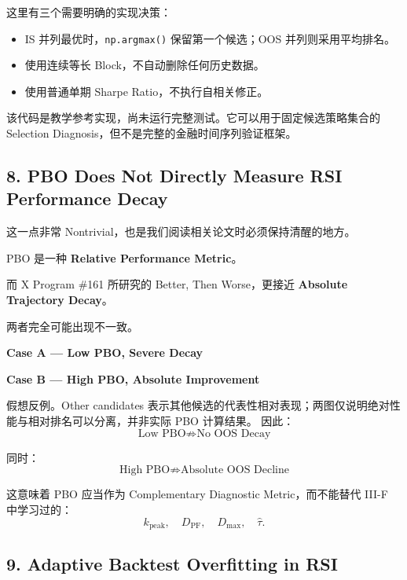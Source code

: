 这里有三个需要明确的实现决策：

\begin{itemize}
\tightlist
\item
  IS 并列最优时，\texttt{np.argmax()} 保留第一个候选；OOS 并列则采用平均排名。
\item
  使用连续等长 Block，不自动删除任何历史数据。
\item
  使用普通单期 Sharpe Ratio，不执行自相关修正。
\end{itemize}

该代码是教学参考实现，尚未运行完整测试。它可以用于固定候选策略集合的 Selection Diagnosis，但不是完整的金融时间序列验证框架。

\hypertarget{part-4-71-0001-pbo-does-not-directly-measure-rsi-performance-decay}{%
\subsection{8. PBO Does Not Directly Measure RSI Performance Decay}\label{part-4-71-0001-pbo-does-not-directly-measure-rsi-performance-decay}}

这一点非常 Nontrivial，也是我们阅读相关论文时必须保持清醒的地方。

PBO 是一种 \textbf{Relative Performance Metric}。

而 X Program \#161 所研究的 Better, Then Worse，更接近 \textbf{Absolute Trajectory Decay}。

两者完全可能出现不一致。

\textbf{Case A --- Low PBO, Severe Decay}


\textbf{Case B --- High PBO, Absolute Improvement}


假想反例。Other candidates 表示其他候选的代表性相对表现；两图仅说明绝对性能与相对排名可以分离，并非实际 PBO 计算结果。 因此：
\[\boxed{
\text{Low PBO}
\not\Rightarrow
\text{No OOS Decay}
}\]

同时：
\[\boxed{
\text{High PBO}
\not\Rightarrow
\text{Absolute OOS Decline}
}\]

这意味着 PBO 应当作为 Complementary Diagnostic Metric，而不能替代 III-F 中学习过的：
\[k_{\mathrm{peak}},\quad
D_{\mathrm{PF}},\quad
D_{\max},\quad
\hat\tau.\]

\hypertarget{part-4-71-0001-adaptive-backtest-overfitting-in-rsi}{%
\subsection{9. Adaptive Backtest Overfitting in RSI}\label{part-4-71-0001-adaptive-backtest-overfitting-in-rsi}}

